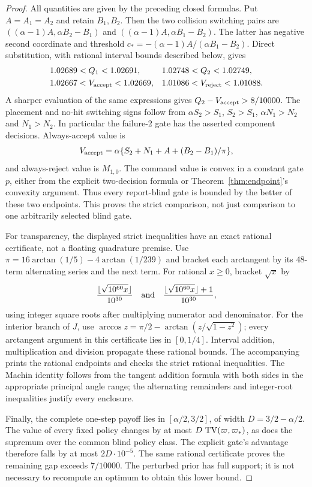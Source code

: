 \begin{proof}
All quantities are given by the preceding closed formulas. Put $A=A_1=A_2$ and retain $B_1,B_2$. Then the two collision switching pairs are
$((\alpha-1)A,\alpha B_2-B_1)$ and
$((\alpha-1)A,\alpha B_1-B_2)$.
The latter has negative second coordinate and threshold
$c_*=-(\alpha-1)A/(\alpha B_1-B_2)$. Direct substitution, with rational interval bounds described below, gives
\begin{align*}
 1.02689&<Q_1<1.02691,&1.02748&<Q_2<1.02749,\\
 1.02667&<V_{\rm accept}<1.02669,&1.01086&<V_{\rm reject}<1.01088.
\end{align*}
A sharper evaluation of the same expressions gives
$Q_2-V_{\rm accept}>8/10000$. The placement and no-hit switching signs follow from $\alpha S_2>S_1$, $S_2>S_1$, $\alpha N_1>N_2$ and $N_1>N_2$. In particular the failure-2 gate has the asserted component decisions. Always-accept value is
\[
 V_{\rm accept}=\alpha\{S_2+N_1+A+(B_2-B_1)/\pi\},
\]
and always-reject value is $M_{1,0}$. The command value is convex in a constant gate $p$, either from the explicit two-decision formula or Theorem~\ref{thm:endpoint}'s convexity argument. Thus every report-blind gate is bounded by the better of these two endpoints. This proves the strict comparison, not just comparison to one arbitrarily selected blind gate.

For transparency, the displayed strict inequalities have an exact rational certificate, not a floating quadrature premise. Use
$\pi=16\arctan(1/5)-4\arctan(1/239)$ and bracket each arctangent by its 48-term alternating series and the next term. For rational $x\ge0$, bracket $\sqrt{x}$ by
\[
 \frac{\lfloor\sqrt{10^{60}x}\rfloor}{10^{30}}
 \quad\hbox{and}\quad
 \frac{\lfloor\sqrt{10^{60}x}\rfloor+1}{10^{30}},
\]
using integer square roots after multiplying numerator and denominator. For the interior branch of $J$, use
$\arccos z=\pi/2-\arctan(z/\sqrt{1-z^2})$; every arctangent argument in this certificate lies in $[0,1/4]$. Interval addition, multiplication and division propagate these rational bounds. The accompanying  prints the rational endpoints and checks the strict rational inequalities. The Machin identity follows from the tangent addition formula with both sides in the appropriate principal angle range; the alternating remainders and integer-root inequalities justify every enclosure.

Finally, the complete one-step payoff lies in $[\alpha/2,3/2]$, of width $D=3/2-\alpha/2$. The value of every fixed policy changes by at most $D\,\operatorname{TV}(\varpi,\varpi_*)$, as does the supremum over the common blind policy class. The explicit gate's advantage therefore falls by at most $2D\cdot10^{-5}$. The same rational certificate proves the remaining gap exceeds $7/10000$. The perturbed prior has full support; it is not necessary to recompute an optimum to obtain this lower bound.
\end{proof}

